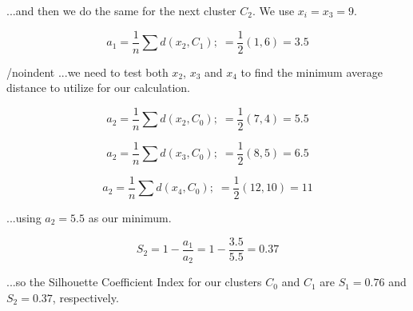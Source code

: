\documentclass{article}
\begin{document}
\noindent ...and then we do the same for the next cluster $C_2$. We use $x_i=x_3=9$.

\begin{equation}
    a_1 = \frac{1}{n} \sum d(x_2, C_1); \; = \frac{1}{2} (1, 6) = 3.5
\end{equation}

/noindent ...we need to test both $x_2$, $x_3$ and $x_4$ to find the minimum average distance to utilize for our calculation.

\begin{equation}
    a_2 = \frac{1}{n} \sum d(x_2, C_0); \; = \frac{1}{2} (7, 4) = 5.5
\end{equation}

\begin{equation}
    a_2 = \frac{1}{n} \sum d(x_3, C_0); \; = \frac{1}{2} (8, 5) = 6.5
\end{equation}

\begin{equation}
    a_2 = \frac{1}{n} \sum d(x_4, C_0); \; = \frac{1}{2} (12, 10) = 11
\end{equation}

\noindent ...using $a_2=5.5$ as our minimum.

\begin{equation}
    S_2 = 1- \frac{a_1}{a_2} = 1 - \frac{3.5}{5.5} = 0.37
\end{equation}

\noindent ...so the Silhouette Coefficient Index for our clusters $C_0$ and $C_1$ are $S_1=0.76$ and $S_2=0.37$, respectively.
\end{document}
